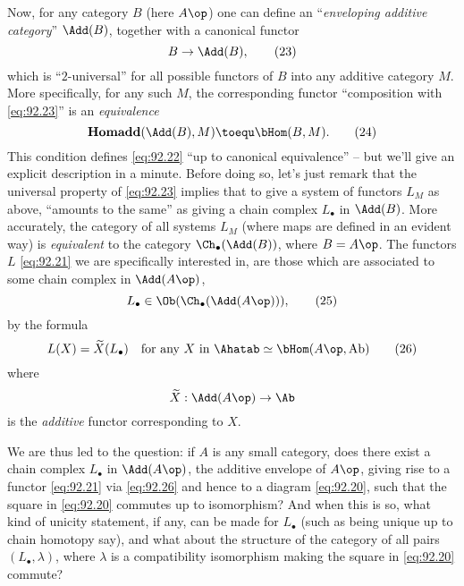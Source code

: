 Now, for any category $B$ (here $A\op$) one can define an
``\emph{enveloping additive category}'' $\Add(B)$, together with a
canonical functor
\begin{equation}
  \label{eq:92.23}
  B\to \Add(B),\tag{23}
\end{equation}
which is ``$2$-universal'' for all possible functors of $B$ into any
additive category $M$. More specifically, for any such $M$, the
corresponding functor ``composition with
\eqref{eq:92.23}'' is an \emph{equivalence}
\begin{equation}
  \label{eq:92.24}
  \mathbf{Homadd}(\Add(B),M) \toequ \bHom(B,M).\tag{24}
\end{equation}
This condition defines \eqref{eq:92.22} ``up to canonical equivalence''
-- but we'll give an explicit description in a minute. Before doing
so, let's just remark that the universal property of \eqref{eq:92.23}
implies that to give a system of functors $L_M$ as above, ``amounts to
the same'' as giving a chain complex $L_\bullet$ in $\Add(B)$. More
accurately, the category of all systems $L_M$ (where maps are defined
in an evident way) is \emph{equivalent} to the category
$\Ch_\bullet(\Add(B))$, where $B=A\op$. The functors $L$
\eqref{eq:92.21} we are specifically interested in, are those which
are associated to some chain complex in $\Add(A\op)$,
\begin{equation}
  \label{eq:92.25}
  L_\bullet\in\Ob(\Ch_\bullet(\Add(A\op))),\tag{25}
\end{equation}
by the formula
\begin{equation}
  \label{eq:92.26}
  L(X) = \widetilde X(L_\bullet)\quad\text{for any $X$ in
    $\Ahatab\simeq\bHom(A\op,\mathrm{Ab})$}\tag{26}
\end{equation}
where
\[\widetilde X: \Add(A\op)\to\Ab\]
is the \emph{additive} functor corresponding to $X$.

We are thus led to the question: if $A$ is any small category, does
there exist a chain complex $L_\bullet$ in $\Add(A\op)$, the additive
envelope of $A\op$, giving rise to a functor \eqref{eq:92.21} via
\eqref{eq:92.26} and hence to a diagram \eqref{eq:92.20}, such that
the square in \eqref{eq:92.20} commutes up to isomorphism? And when
this is so, what kind of unicity statement, if any, can be made for
$L_\bullet$ (such as being unique up to chain homotopy say), and what
about the structure of the category of all pairs
$(L_\bullet,\lambda)$, where $\lambda$ is a compatibility isomorphism
making the square in \eqref{eq:92.20} commute?

